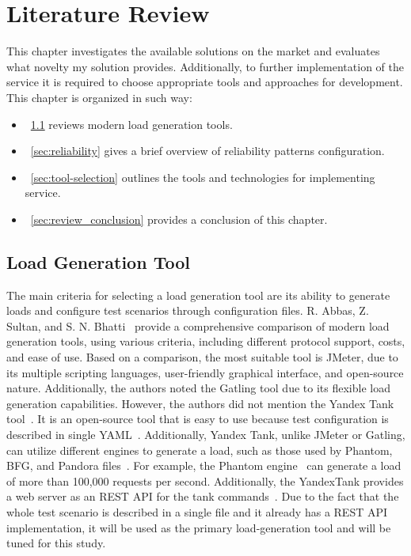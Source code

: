 \chapter{Literature Review}
\label{ch:lr}

This chapter investigates the available solutions on the market and evaluates what novelty my solution provides.
Additionally, to further implementation of the service it is required to choose appropriate tools and approaches for development.
This chapter is organized in such way:

\begin{itemize}
    \item~\ref{sec:load_generation} reviews modern load generation tools.
    \item~\ref{sec:reliability} gives a brief overview of reliability patterns configuration.
    \item~\ref{sec:tool-selection} outlines the tools and technologies for implementing service.
    \item~\ref{sec:review_conclusion} provides a conclusion of this chapter.
\end{itemize}

\section{Load Generation Tool}\label{sec:load_generation}
The main criteria for selecting a load generation tool are its ability to generate loads and configure test scenarios through configuration files.
R. Abbas, Z. Sultan, and S. N. Bhatti~\cite{load_testing_tools} provide a comprehensive comparison of modern load generation tools, using various criteria, including different protocol support, costs, and ease of use.
Based on a comparison, the most suitable tool is JMeter, due to its multiple scripting languages, user-friendly graphical interface, and open-source nature. Additionally, the authors noted the Gatling tool due to its flexible load generation capabilities. However, the authors did not mention the Yandex Tank tool~\cite{yandex_tank}. It is an open-source tool that is easy to use because test configuration is described in single YAML~\cite{yaml}. Additionally, Yandex Tank, unlike JMeter or Gatling, can utilize different engines to generate a load, such as those used by Phantom, BFG, and Pandora files~\cite{load_testing_tools_rus}. For example, the Phantom engine~\cite{phantom} can generate a load of more than 100,000 requests per second.
Additionally, the YandexTank provides a web server as an REST API for the tank commands~\cite{yandex_tank_api}.
Due to the fact that the whole test scenario is described in a single file and it already has a REST API implementation, it will be used as the primary load-generation tool and will be tuned for this study.

